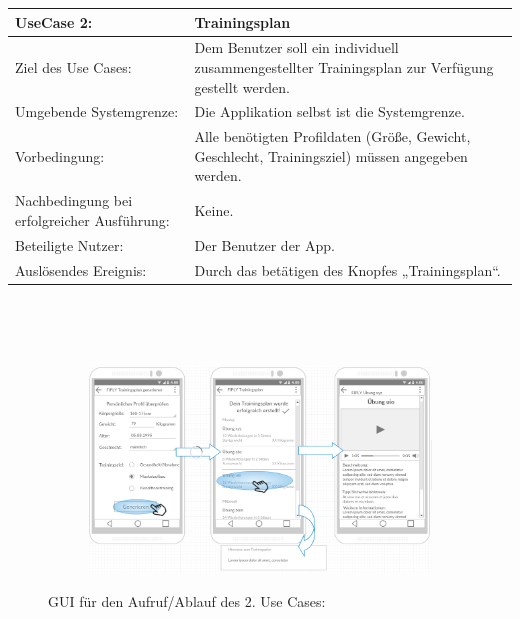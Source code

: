 \documentclass[FIPLY_base.tex]{subfiles}
\begin{document}
	\begin{center}
		\def\arraystretch{1.3}%
		\begin{tabular}{| p{5cm} | p{6cm} |}
			\hline
		    UseCase 2: & Trainingsplan
			\\ \hline 
			Ziel des Use Cases: & Dem Benutzer soll ein individuell zusammengestellter Trainingsplan zur Verfügung gestellt werden. 
			\\ \hline
			Umgebende Systemgrenze: & Die Applikation selbst ist die Systemgrenze. 
			\\ \hline
			Vorbedingung: & Alle benötigten Profildaten (Größe, Gewicht, Geschlecht, Trainingsziel) müssen angegeben werden.  
			\\ \hline
			Nachbedingung bei erfolgreicher Ausführung: & Keine.  
			\\ \hline
			Beteiligte Nutzer: & Der Benutzer der App. 
			\\ \hline
			Auslösendes Ereignis: & Durch das betätigen des Knopfes „Trainingsplan“. 
			\\ \hline
		\end{tabular} \\
	\end{center}
		\ \\
	\begin{figure}[H]
		\begin{subfigure}[b]{0.3\textwidth}
			\centering
			\includegraphics[scale=0.32]{img/Trainingsplangenerieren}
		\end{subfigure}
		\caption{GUI für den Aufruf/Ablauf des 2. Use Cases:}
	\end{figure}
		\ \\
\end{document}
